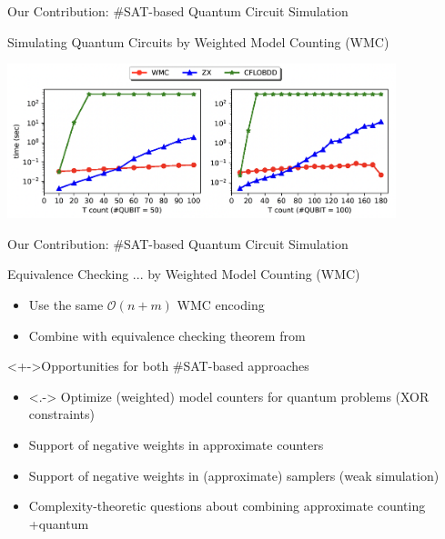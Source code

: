 \begin{refframe}{\alert{Our Contribution:} \#SAT-based Quantum Circuit Simulation}

Simulating Quantum Circuits by Weighted Model Counting (WMC) \cite{mei2024simulating}

\includegraphics[height=4.5cm]{graphics/random-quokka}

	
\end{refframe}



%
\begin{refframe}{\alert{Our Contribution:} \#SAT-based Quantum Circuit Simulation}

\begin{block}{Equivalence Checking ... by Weighted Model Counting (WMC)\cite{mei2024eq}}
\begin{itemize}
\item<+-> Use the same $\mathcal O(n +m)$ WMC encoding
\item<+-> Combine with equivalence checking theorem from~\cite{ours} 
\end{itemize}
\end{block}


\begin{alertblock}<+->{Opportunities for both \#SAT-based approaches}
\begin{itemize}
\item<.-> Optimize (weighted) model counters for quantum problems (XOR constraints)
\item<+-> Support of negative weights in approximate counters
\item<+-> Support of negative weights in (approximate) samplers (weak simulation)
\item<+-> Complexity-theoretic questions about combining approximate counting +quantum
\end{itemize}
\end{alertblock}

\end{refframe}






